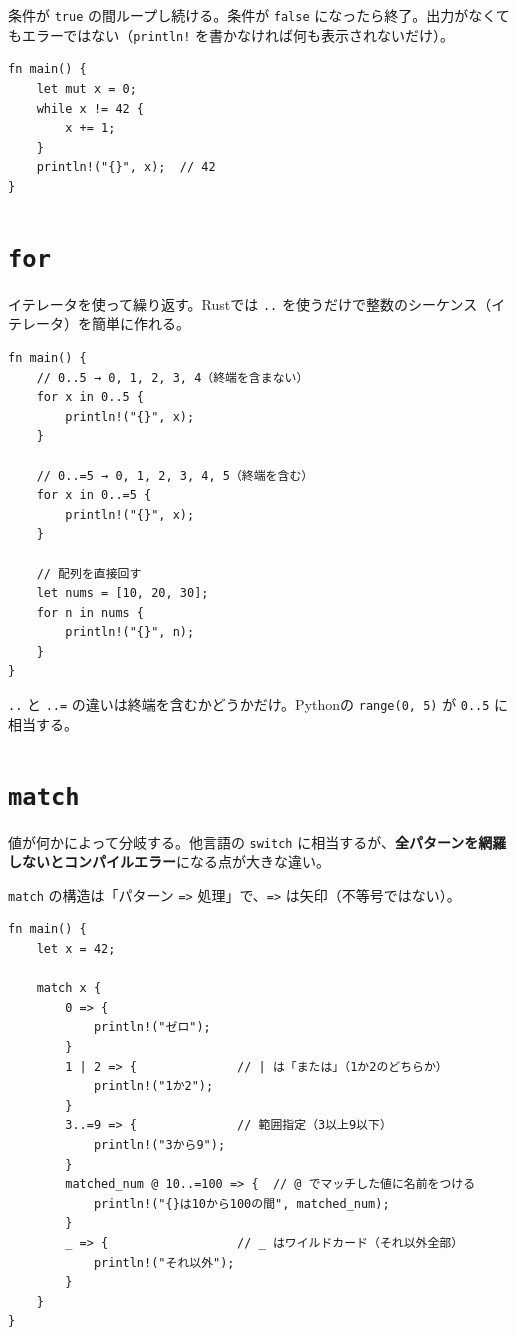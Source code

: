 \documentclass[12pt,a4paper]{article}
\begin{document}
条件が \texttt{true} の間ループし続ける。条件が \texttt{false} になったら終了。出力がなくてもエラーではない（\texttt{println!} を書かなければ何も表示されないだけ）。

\begin{lstlisting}
fn main() {
    let mut x = 0;
    while x != 42 {
        x += 1;
    }
    println!("{}", x);  // 42
}
\end{lstlisting}

\section{\texttt{for}}

イテレータを使って繰り返す。Rustでは \texttt{..} を使うだけで整数のシーケンス（イテレータ）を簡単に作れる。

\begin{lstlisting}
fn main() {
    // 0..5 → 0, 1, 2, 3, 4（終端を含まない）
    for x in 0..5 {
        println!("{}", x);
    }

    // 0..=5 → 0, 1, 2, 3, 4, 5（終端を含む）
    for x in 0..=5 {
        println!("{}", x);
    }

    // 配列を直接回す
    let nums = [10, 20, 30];
    for n in nums {
        println!("{}", n);
    }
}
\end{lstlisting}

\begin{notebox}
\texttt{..} と \texttt{..=} の違いは終端を含むかどうかだけ。Pythonの \texttt{range(0, 5)} が \texttt{0..5} に相当する。
\end{notebox}

\section{\texttt{match}}

値が何かによって分岐する。他言語の \texttt{switch} に相当するが、\textbf{全パターンを網羅しないとコンパイルエラー}になる点が大きな違い。

\texttt{match} の構造は「パターン \texttt{=>} 処理」で、\texttt{=>} は矢印（不等号ではない）。

\begin{lstlisting}
fn main() {
    let x = 42;

    match x {
        0 => {
            println!("ゼロ");
        }
        1 | 2 => {              // | は「または」（1か2のどちらか）
            println!("1か2");
        }
        3..=9 => {              // 範囲指定（3以上9以下）
            println!("3から9");
        }
        matched_num @ 10..=100 => {  // @ でマッチした値に名前をつける
            println!("{}は10から100の間", matched_num);
        }
        _ => {                  // _ はワイルドカード（それ以外全部）
            println!("それ以外");
        }
    }
}
\end{lstlisting}
\end{document}
